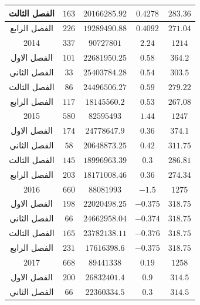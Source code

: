 \documentclass[10pt,a4paper]{report}
\begin{document}
\begin{longtable}{|c|c|c|c|c|}
	الفصل الثالث & $163$                 & $20166285.92$ & $0.4278$    & $283.36$  \\ \hline
	الفصل الرابع & $226$                 & $19289490.88$ & $0.4092$    & $271.04$  \\ \hline
	2014         & $337$                 & $90727801$    & $2.24$      & $1214$    \\ \hline
	الفصل الاول  & $101$                 & $22681950.25$ & $0.58$      & $364.2$   \\ \hline
	الفصل الثاني & $33$                  & $25403784.28$ & $0.54$      & $303.5$   \\ \hline
	الفصل الثالث & $86$                  & $24496506.27$ & $0.59$      & $279.22$  \\ \hline
	الفصل الرابع & $117$                 & $18145560.2$  & $0.53$      & $267.08$  \\ \hline
	2015         & $580$                 & $82595493$    & $1.44$      & $1247$    \\ \hline
	الفصل الاول  & $174$                 & $24778647.9$  & $0.36$      & $374.1$   \\ \hline
	الفصل الثاني & $58$                  & $20648873.25$ & $0.42$      & $311.75$  \\ \hline
	الفصل الثالث & $145$                 & $18996963.39$ & $0.3$       & $286.81$  \\ \hline
	الفصل الرابع & $203$                 & $18171008.46$ & $0.36$      & $274.34$  \\ \hline
	2016         & $660$                 & $88081993$    & $-1.5$      & $1275$    \\ \hline
	الفصل الاول  & $198$                 & $22020498.25$ & $-0.375$    & $318.75$  \\ \hline
	الفصل الثاني & $66$                  & $24662958.04$ & $-0.374$    & $318.75$  \\ \hline
	الفصل الثالث & $165$                 & $23782138.11$ & $-0.376$    & $318.75$  \\ \hline
	الفصل الرابع & $231$                 & $17616398.6$  & $-0.375$    & $318.75$  \\ \hline
	2017         & $668$                 & $89441338$    & $0.19$      & $1258$    \\ \hline
	الفصل الاول  & $200$                 & $26832401.4$  & $0.9$       & $314.5$   \\ \hline
	الفصل الثاني & $66$                  & $22360334.5$  & $0.3$       & $314.5$   \\ \hline

\end{longtable}
\end{document}
